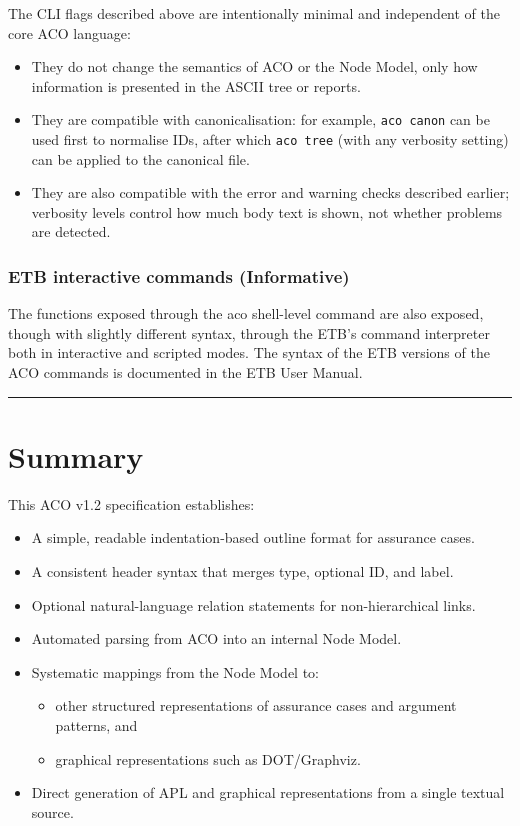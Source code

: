 \documentclass[11pt]{article}
\begin{document}
The CLI flags described above are intentionally minimal and independent of the core ACO language:

\begin{itemize}[leftmargin=2em]
  \item They do not change the semantics of ACO or the Node Model, only how information is presented in the ASCII tree or reports.
  \item They are compatible with canonicalisation: for example, \texttt{aco canon} can be used first to normalise IDs, after which \texttt{aco tree} (with any verbosity setting) can be applied to the canonical file.
  \item They are also compatible with the error and warning checks described earlier; verbosity levels control how much body text is shown, not whether problems are detected.
\end{itemize}

\subsubsection*{ETB interactive commands (Informative)}

The functions exposed through the aco shell-level command are also exposed, though with slightly different syntax, through the ETB's command interpreter both in interactive and scripted modes.
The syntax of the ETB versions of the ACO commands is documented in the ETB User Manual.

\bigskip
\hrule
\bigskip

\section{Summary}

This ACO v1.2 specification establishes:

\begin{itemize}[leftmargin=2em]
  \item A simple, readable indentation-based outline format for assurance cases.
  \item A consistent header syntax that merges type, optional ID, and label.
  \item Optional natural-language relation statements for non-hierarchical links.
  \item Automated parsing from ACO into an internal Node Model.
  \item Systematic mappings from the Node Model to:
  \begin{itemize}[leftmargin=1.5em]
    \item other structured representations of assurance cases and argument patterns, and
    \item graphical representations such as DOT/Graphviz.
  \end{itemize}
  \item Direct generation of APL and graphical representations from a single textual source.
\end{itemize}
\end{document}
